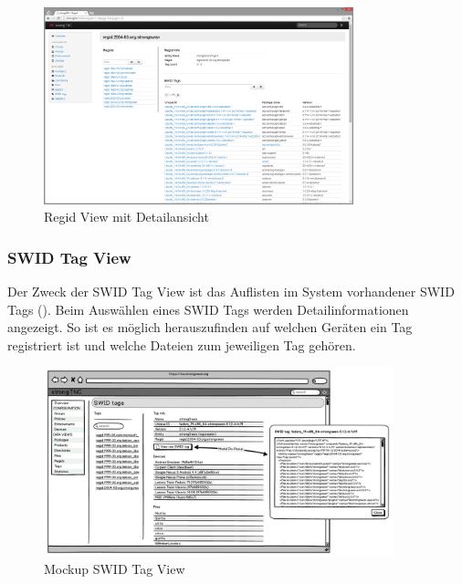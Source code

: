 \begin{figure}[H]
	\centering
	\includegraphics[width=0.8\textwidth]{./images/Views/regid-view}
	\caption{Regid View mit Detailansicht}
	\label{fig:regid-view}
\end{figure}


\subsubsection{SWID Tag View}
Der Zweck der SWID Tag View ist das Auflisten im System vorhandener SWID Tags
(). Beim Auswählen eines SWID Tags werden
Detailinformationen angezeigt. So ist es möglich herauszufinden auf welchen
Geräten ein Tag registriert ist und welche Dateien zum jeweiligen Tag gehören.

\begin{figure}[H]
	\centering
	\includegraphics[width=0.9\textwidth]{./images/mockups/swid-tag-view}
	\caption{Mockup SWID Tag View}
	\label{fig:swid-tag-view-mockup}
\end{figure}


